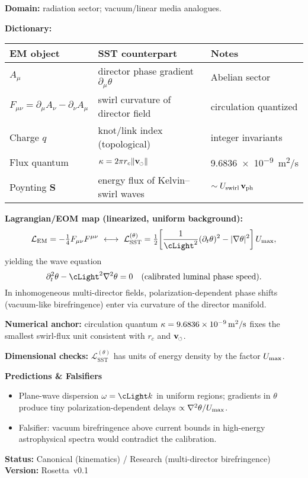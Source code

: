 \documentclass[11pt]{article}
\newcommand{\swirlarrow}{%
	\mathchoice{\mkern-2mu\scriptstyle\boldsymbol{\circlearrowleft}}%
	{\mkern-2mu\scriptstyle\boldsymbol{\circlearrowleft}}%
	{\mkern-2mu\scriptscriptstyle\boldsymbol{\circlearrowleft}}%
	{\mkern-2mu\scriptscriptstyle\boldsymbol{\circlearrowleft}}%
}
\newcommand{\vswirl}{\mathbf{v}_{\swirlarrow}}
\providecommand{\rc}{r_c} %
\begin{document}
    \begin{tcolorbox}[title=Rosetta Card: Maxwell/QED $\to$ SST (multi-director swirl)]
    \textbf{Domain:} radiation sector; vacuum/linear media analogues.

    \textbf{Dictionary:}
    \begin{tabular}{@{}lll@{}}
    \toprule
    EM object & SST counterpart & Notes \\
    \midrule
    $A_\mu$ & director phase gradient $\partial_\mu\theta$ & Abelian sector \\
    $F_{\mu\nu}=\partial_\mu A_\nu-\partial_\nu A_\mu$ & swirl curvature of director field & circulation quantized \\
    Charge $q$ & knot/link index (topological) & integer invariants \\
    Flux quantum & $\Circulation=2\pi\rc\lVert\vswirl\rVert$ & \SI{9.6836e-9}{m^2/s} \\
    Poynting $\mathbf{S}$ & energy flux of Kelvin–swirl waves & $\sim U_{\text{swirl}}\,\mathbf{v}_{\rm ph}$ \\
    \bottomrule
    \end{tabular}

    \textbf{Lagrangian/EOM map (linearized, uniform background):}
    \[
        \mathcal{L}_{\text{EM}}=-\tfrac14 F_{\mu\nu}F^{\mu\nu}
        \ \longleftrightarrow\
        \mathcal{L}_{\text{SST}}^{(\theta)}=\tfrac12\!\left[\frac{1}{\cLight^2}(\partial_t\theta)^2-\lvert\nabla\theta\rvert^2\right]\Umax,
    \]
    yielding the wave equation
    \[
        \partial_t^2\theta-\cLight^2\nabla^2\theta=0
        \quad(\text{calibrated luminal phase speed}).
    \]
    In inhomogeneous multi-director fields, polarization-dependent phase shifts (vacuum-like birefringence) enter via curvature of the director manifold.

    \textbf{Numerical anchor:} circulation quantum $\kappa=\SI{9.6836e-9}{m^2/s}$ fixes the smallest swirl-flux unit consistent with $\rc$ and $\vswirl$.

    \textbf{Dimensional checks:} $\mathcal{L}_{\text{SST}}^{(\theta)}$ has units of energy density by the factor $U_{\max}$.

    \textbf{Predictions \& Falsifiers}
    \begin{itemize}\itemsep2pt
    \item Plane-wave dispersion $\omega=\cLight k$ in uniform regions; gradients in $\theta$ produce tiny polarization-dependent delays $\propto\nabla^2\theta/U_{\max}$.
    \item Falsifier: vacuum birefringence above current bounds in high-energy astrophysical spectra would contradict the calibration.
    \end{itemize}

    \textbf{Status:} Canonical (kinematics) / Research (multi-director birefringence) \hfill \textbf{Version:} Rosetta~v0.1
    \end{tcolorbox}
\end{document}
